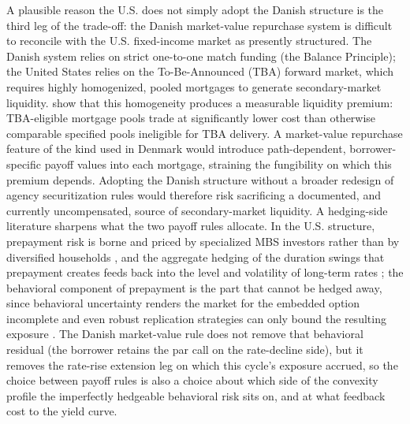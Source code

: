 \documentclass[12pt]{article}
\begin{document}
A plausible reason the U.S. does not simply adopt the Danish structure is the third leg of the trade-off: the Danish market-value repurchase system is difficult to reconcile with the U.S. fixed-income market as presently structured. The Danish system relies on strict one-to-one match funding (the Balance Principle); the United States relies on the To-Be-Announced (TBA) forward market, which requires highly homogenized, pooled mortgages to generate secondary-market liquidity. \citet{vickery2013} show that this homogeneity produces a measurable liquidity premium: TBA-eligible mortgage pools trade at significantly lower cost than otherwise comparable specified pools ineligible for TBA delivery. A market-value repurchase feature of the kind used in Denmark would introduce path-dependent, borrower-specific payoff values into each mortgage, straining the fungibility on which this premium depends. Adopting the Danish structure without a broader redesign of agency securitization rules would therefore risk sacrificing a documented, and currently uncompensated, source of secondary-market liquidity. A hedging-side literature sharpens what the two payoff rules allocate. In the U.S. structure, prepayment risk is borne and priced by specialized MBS investors rather than by diversified households \citep{gabaix2007}, and the aggregate hedging of the duration swings that prepayment creates feeds back into the level and volatility of long-term rates \citep{malkhozov2016}; the behavioral component of prepayment is the part that cannot be hedged away, since behavioral uncertainty renders the market for the embedded option incomplete and even robust replication strategies can only bound the resulting exposure \citep{perotti2024}. The Danish market-value rule does not remove that behavioral residual (the borrower retains the par call on the rate-decline side), but it removes the rate-rise extension leg on which this cycle's exposure accrued, so the choice between payoff rules is also a choice about which side of the convexity profile the imperfectly hedgeable behavioral risk sits on, and at what feedback cost to the yield curve.
\end{document}
